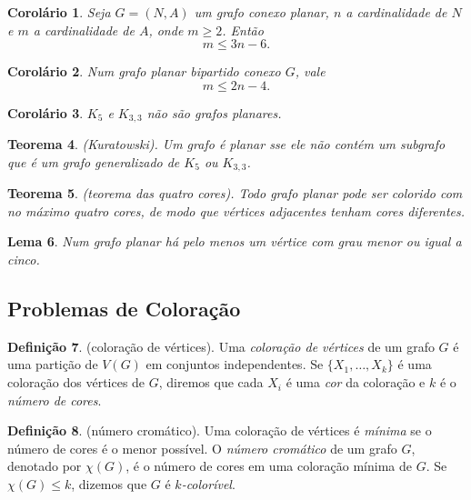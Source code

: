 \documentclass{article}
\theoremstyle{plain}
\newtheorem{thm}{Teorema}[section]
\newtheorem{lem}[thm]{Lema}
\newtheorem{cor}[thm]{Corolário}
\theoremstyle{definition}
\newtheorem{defn}[thm]{Definição}
\theoremstyle{remark}
\begin{document}
\begin{cor}
    Seja \(G = (N, A)\) um grafo conexo planar, \(n\) a cardinalidade de \(N\) e \(m\) a cardinalidade de \(A\), onde \(m \geq 2\). Então
    \begin{equation}
        m \leq 3n - 6.
    \end{equation}
\end{cor}

\begin{cor}
    Num grafo planar bipartido conexo \(G\), vale 
    \begin{equation}
        m \leq 2n - 4.
    \end{equation}
\end{cor}

\begin{cor}
    \(K_5\) e \(K_{3,3}\) não são grafos planares.
\end{cor}

\begin{thm} (Kuratowski).
    Um grafo é planar sse ele não contém um subgrafo que é um grafo generalizado de \(K_5\) ou \(K_{3,3}\).
\end{thm}

\begin{thm} (teorema das quatro cores).
    Todo grafo planar pode ser colorido com no máximo quatro cores, de modo que vértices adjacentes tenham cores diferentes.
\end{thm}

\begin{lem}
    Num grafo planar há pelo menos um vértice com grau menor ou igual a cinco.
\end{lem}

\subsection{Problemas de Coloração}

\begin{defn} (coloração de vértices).
    Uma \emph{coloração de vértices} de um grafo \(G\) é uma partição de \(V(G)\) em conjuntos independentes. Se \(\{X_1, \ldots, X_k\}\) é uma coloração dos vértices de \(G\), diremos que cada \(X_i\) é uma \emph{cor} da coloração e \(k\) é o \emph{número de cores}.
\end{defn}

\begin{defn} (número cromático).
    Uma coloração de vértices é \emph{mínima} se o número de cores é o menor possível. O \emph{número cromático} de um grafo \(G\), denotado por \(\chi(G)\), é o número de cores em uma coloração mínima de \(G\).
    Se \(\chi(G) \leq k\), dizemos que \(G\) é \emph{\(k\)-colorível}.
\end{defn}
\end{document}
